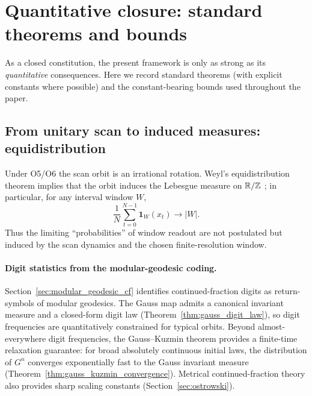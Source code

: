 \section{Quantitative closure: standard theorems and bounds}
\label{sec:verification_route}

As a closed constitution, the present framework is only as strong as its \emph{quantitative} consequences. Here we record standard theorems (with explicit constants where possible) and the constant-bearing bounds used throughout the paper.

\subsection{From unitary scan to induced measures: equidistribution}
\label{sec:quant_equidistribution}

Under O5/O6 the scan orbit is an irrational rotation. Weyl's equidistribution theorem implies that the orbit induces the Lebesgue measure on $\mathbb{R}/\mathbb{Z}$ \cite{Weyl1916,KuipersNiederreiter1974}; in particular, for any interval window $W$,
\begin{equation}
\frac{1}{N}\sum_{t=0}^{N-1}\mathbf{1}_W(x_t)\to |W|.
\end{equation}
Thus the limiting ``probabilities'' of window readout are not postulated but induced by the scan dynamics and the chosen finite-resolution window.

\paragraph{Digit statistics from the modular-geodesic coding.}
Section~\ref{sec:modular_geodesic_cf} identifies continued-fraction digits as return-symbols of modular geodesics. The Gauss map admits a canonical invariant measure and a closed-form digit law (Theorem~\ref{thm:gauss_digit_law}), so digit frequencies are quantitatively constrained for typical orbits. Beyond almost-everywhere digit frequencies, the Gauss--Kuzmin theorem provides a finite-time relaxation guarantee: for broad absolutely continuous initial laws, the distribution of $G^n$ converges exponentially fast to the Gauss invariant measure (Theorem~\ref{thm:gauss_kuzmin_convergence}). Metrical continued-fraction theory also provides sharp scaling constants (Section~\ref{sec:ostrowski}).

